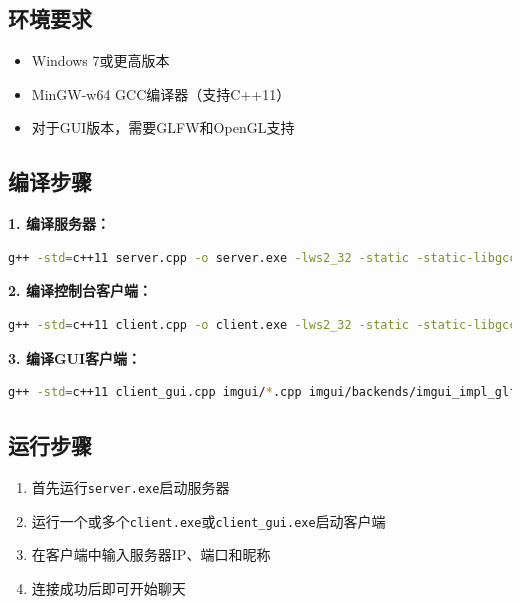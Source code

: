\documentclass[12pt, a4paper]{article}
\newcommand{\cmd}[1]{\texttt{#1}}
\begin{document}
\subsection*{环境要求}

\begin{itemize}[itemsep=3pt]
  \item Windows 7或更高版本
  \item MinGW-w64 GCC编译器（支持C++11）
  \item 对于GUI版本，需要GLFW和OpenGL支持
\end{itemize}

\subsection*{编译步骤}

\textbf{1. 编译服务器：}
\begin{lstlisting}[language=bash]
g++ -std=c++11 server.cpp -o server.exe -lws2_32 -static -static-libgcc -static-libstdc++
\end{lstlisting}

\textbf{2. 编译控制台客户端：}
\begin{lstlisting}[language=bash]
g++ -std=c++11 client.cpp -o client.exe -lws2_32 -static -static-libgcc -static-libstdc++
\end{lstlisting}

\textbf{3. 编译GUI客户端：}
\begin{lstlisting}[language=bash]
g++ -std=c++11 client_gui.cpp imgui/*.cpp imgui/backends/imgui_impl_glfw.cpp imgui/backends/imgui_impl_opengl3.cpp -o client_gui.exe -I./imgui -I./imgui/backends -lglfw3 -lopengl32 -lgdi32 -lws2_32 -static -static-libgcc -static-libstdc++
\end{lstlisting}

\subsection*{运行步骤}

\begin{enumerate}[itemsep=3pt]
  \item 首先运行\cmd{server.exe}启动服务器
  \item 运行一个或多个\cmd{client.exe}或\cmd{client\_gui.exe}启动客户端
  \item 在客户端中输入服务器IP、端口和昵称
  \item 连接成功后即可开始聊天
\end{enumerate}
\end{document}
